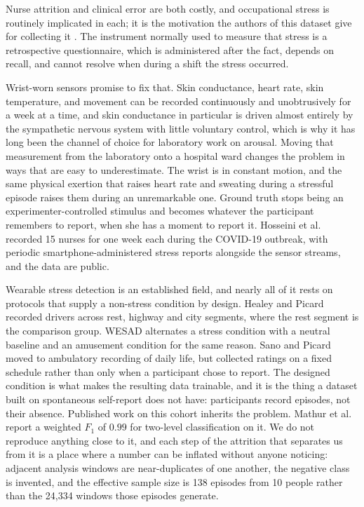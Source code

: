 \documentclass{article}
\begin{document}
Nurse attrition and clinical error are both costly, and occupational stress is
routinely implicated in each; it is the motivation the authors of this dataset
give for collecting it \cite{hosseini2022}. The instrument normally used to
measure that stress is a retrospective questionnaire, which is administered
after the fact, depends on recall, and cannot resolve when during a shift the
stress occurred.

Wrist-worn sensors promise to fix that. Skin conductance, heart rate, skin
temperature, and movement can be recorded continuously and unobtrusively for a
week at a time, and skin conductance in particular is driven almost entirely by
the sympathetic nervous system with little voluntary control, which is why it
has long been the channel of choice for laboratory work on arousal. Moving that
measurement from the laboratory onto a hospital ward changes the problem in
ways that are easy to underestimate. The wrist is in constant motion, and the
same physical exertion that raises heart rate and sweating during a stressful
episode raises them during an unremarkable one. Ground truth stops being an
experimenter-controlled stimulus and becomes whatever the participant remembers
to report, when she has a moment to report it. Hosseini et al.\
\cite{hosseini2022} recorded 15 nurses for one week each during the COVID-19
outbreak, with periodic smartphone-administered stress reports alongside the
sensor streams, and the data are public.

Wearable stress detection is an established field, and nearly all of it rests
on protocols that supply a non-stress condition by design. Healey and Picard
\cite{healey2005} recorded drivers across rest, highway and city segments,
where the rest segment is the comparison group. WESAD \cite{schmidt2018}
alternates a stress condition with a neutral baseline and an amusement
condition for the same reason. Sano and Picard \cite{sano2013} moved to
ambulatory recording of daily life, but collected ratings on a fixed schedule
rather than only when a participant chose to report. The designed condition is
what makes the resulting data trainable, and it is the thing a dataset built on
spontaneous self-report does not have: participants record episodes, not their
absence. Published work on this cohort inherits the problem. Mathur et al.\
\cite{mathur2024} report a weighted $F_1$ of $0.99$ for two-level
classification on it. We do not reproduce anything close to it, and
each step of the attrition that separates us from it is a place where a
number can be inflated without anyone noticing: adjacent analysis windows
are near-duplicates of one another, the negative class is invented, and
the effective sample size is 138 episodes from 10 people rather than the
24{,}334 windows those episodes generate.
\end{document}
